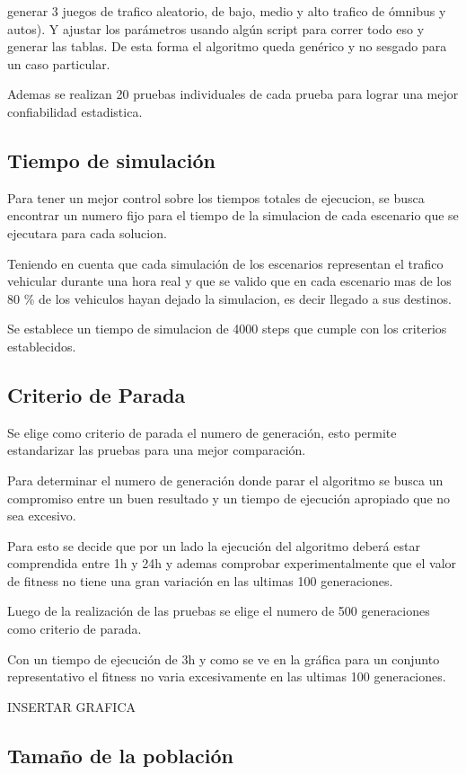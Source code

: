 generar 3 juegos de trafico aleatorio, de bajo, medio y alto trafico de ómnibus y autos). Y ajustar los parámetros usando algún script para correr todo eso y generar las tablas. De esta forma el algoritmo queda genérico y no sesgado para un caso particular.

Ademas se realizan 20 pruebas individuales de cada prueba para lograr una mejor confiabilidad estadistica. 
 
\subsection{Tiempo de simulación}

Para tener un mejor control sobre los tiempos totales de ejecucion, se busca encontrar un numero fijo para el tiempo de la simulacion de cada escenario que se ejecutara para cada solucion.

Teniendo en cuenta que cada simulación de los escenarios representan el trafico vehicular durante una hora real y que se valido que en cada escenario mas de los 80 \% de los vehiculos hayan dejado la simulacion, es decir llegado a sus destinos.

Se establece un tiempo de simulacion de 4000 steps que cumple con los criterios establecidos. 

\subsection{Criterio de Parada}
Se elige como criterio de parada el numero de generación, esto permite estandarizar las pruebas para una mejor comparación.

Para determinar el numero de generación donde parar el algoritmo se busca un compromiso entre un buen resultado y un tiempo de ejecución apropiado que no sea excesivo.

Para esto se decide que por un lado la ejecución del algoritmo deberá estar comprendida entre 1h y 24h y ademas comprobar experimentalmente que el valor de fitness no tiene una gran variación en las ultimas 100 generaciones.

Luego de la realización de las pruebas se elige el numero de 500 generaciones como criterio de parada.

Con un tiempo de ejecución de 3h y como se ve en la gráfica para un conjunto representativo el fitness no varia excesivamente en las ultimas 100 generaciones.


INSERTAR GRAFICA


\subsection{Tamaño de la población}

